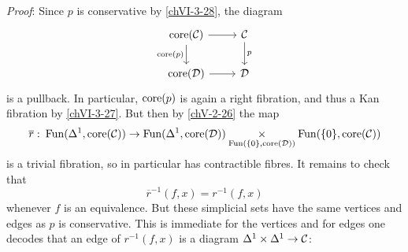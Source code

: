         \emph{Proof}: Since $p$ is conservative by \ref{chVI-3-28}, the diagram
        \begin{equation*}
            \begin{tikzcd}
                \core(\Cc) \arrow[d, "\core(p)"'] \arrow[r] & \Cc \arrow[d, "p"] \\
                \core(\Dd) \arrow[r] & \Dd
            \end{tikzcd}	
        \end{equation*}
        is a pullback. In particular, $\operatorname{core}(p)$ is again a right fibration, and thus a Kan fibration by \ref{chVI-3-27}. But then by \ref{chV-2-26} the map
        \begin{equation*}
            \overline{r} \,\colon \operatorname{Fun}(\Delta^1, \operatorname{core}(\mathcal{C})) \to \operatorname{Fun}(\Delta^1, \operatorname{core}(\mathcal{D})) \underset{\operatorname{Fun}(\{0\}, \operatorname{core}(\mathcal{D}))}{\times} \operatorname{Fun}(\{0\}, \operatorname{core}(\mathcal{C}))
        \end{equation*}
        is a trivial fibration, so in particular has contractible fibres. It remains to check that
        \begin{equation*}
            \overline{r}^{-1}(f, x) = r^{-1}(f, x)
        \end{equation*}
        whenever $f$ is an equivalence. But these simplicial sets have the same vertices and edges as $p$ is conservative. This is immediate for the vertices and for edges one decodes that an edge of $r^{-1}(f, x)$ is a diagram $\Delta^1 \times \Delta^1 \to \mathcal{C}$:

